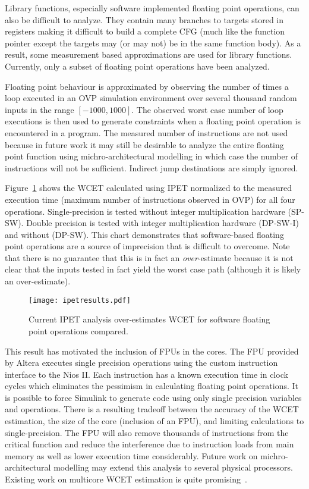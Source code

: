 Library functions, especially software implemented floating point operations, can also be difficult to analyze. They contain many branches to targets stored in registers making it difficult to build a complete CFG (much like the function pointer except the targets may (or may not) be in the same function body). As a result, some measurement based approximations are used for library functions. Currently, only a subset of floating point operations have been analyzed.


Floating point behaviour is approximated by observing the number of times a loop executed in an OVP simulation environment over several thousand random inputs in the range $[-1000,1000]$. The observed worst case number of loop executions is then used to generate constraints when a floating point operation is encountered in a program. The measured number of instructions are not used because in future work it may still be desirable to analyze the entire floating point function using michro-architectural modelling in which case the number of instructions will not be sufficient. Indirect jump destinations are simply ignored. 

Figure~\ref{f:ipetresults} shows the WCET calculated using IPET normalized to the measured execution time (maximum number of instructions observed in OVP) for all four operations. Single-precision is tested without integer multiplication hardware (SP-SW). Double precision is tested with integer multiplication hardware (DP-SW-I) and without (DP-SW). This chart demonstrates that software-based floating point operations are a source of imprecision that is difficult to overcome. Note that there is no guarantee that this is in fact an \emph{over}-estimate because it is not clear that the inputs tested in fact yield the worst case path (although it is likely an over-estimate).

\begin{figure}[h]
\centering
\texttt{[image: ipetresults.pdf]}
\caption{Current IPET analysis over-estimates WCET for software floating point operations compared.}
\label{f:ipetresults}
\end{figure}

This result has motivated the inclusion of FPUs in the cores. The FPU provided by Altera executes single precision operations using the custom instruction interface to the Nios II. Each instruction has a known execution time in clock cycles which eliminates the pessimism in calculating floating point operations. It is possible to force Simulink to generate code using only single precision variables and operations. There is a resulting tradeoff between the accuracy of the WCET estimation, the size of the core (inclusion of an FPU), and limiting calculations to single-precision. The FPU will also remove thousands of instructions from the critical function and reduce the interference due to instruction loads from main memory as well as lower execution time considerably. Future work on michro-architectural modelling may extend this analysis to several physical processors. Existing work on multicore WCET estimation is quite promising~\cite{chattopadhyay2014unified}.

